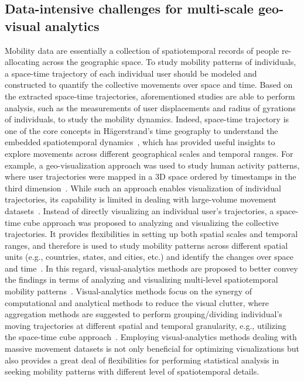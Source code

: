 \documentclass[ijgi,article,submit,moreauthors,pdftex,10pt,a4paper]{mdpi}
\theoremstyle{mdpi}
\newcounter{ex}
\newcounter{re}
\theoremstyle{mdpidefinition}
\begin{document}
\subsection{Data-intensive challenges for multi-scale geo-visual analytics}
Mobility data are essentially a collection of spatiotemporal records of people re-allocating across the geographic space.
To study mobility patterns of individuals, a space-time trajectory of each individual user should be modeled and constructed to quantify the collective movements over space and time.
Based on the extracted space-time trajectories, aforementioned studies are able to perform analysis, such as the measurements of user displacements and radius of gyrations of individuals, to study the mobility dynamics.
Indeed, space-time trajectory is one of the core concepts in H{\"a}gerstrand's time geography to understand the embedded spatiotemporal dynamics~\cite{hagerstrand1985time}, which has provided useful insights to explore movements across different geographical scales and temporal ranges.
For example, a geo-visualization approach was used to study human activity patterns, where user trajectories were mapped in a 3D space ordered by timestamps in the third dimension~\cite{kwan2004geovisualization}.
While such an approach enables visualization of individual trajectories, its capability is limited in dealing with large-volume movement datasets~\cite{andrienko2007designing}.
Instead of directly visualizing an individual user's trajectories, a space-time cube approach was proposed to analyzing and visualizing the collective trajectories.
It provides flexibilities in setting up both spatial scales and temporal ranges, and therefore is used to study mobility patterns across different spatial units (e.g., countries, states, and cities, etc.) and identify the changes over space and time~\cite{maceachren2001research, maceachren2004maps}.
In this regard, visual-analytics methods are proposed to better convey the findings in terms of analyzing and visualizing multi-level spatiotemporal mobility patterns~\cite{andrienko2007designing,andrienko2007visual}.
Visual-analytics methods focus on the synergy of computational and analytical methods to reduce the visual clutter, where aggregation methods are suggested to perform grouping/dividing individual's moving trajectories at different spatial and temporal granularity, e.g., utilizing the space-time cube approach~\cite{andrienko2007designing}.
Employing visual-analytics methods dealing with massive movement datasets is not only beneficial for optimizing visualizations but also provides a great deal of flexibilities for performing statistical analysis in seeking mobility patterns with different level of spatiotemporal details. 
\end{document}
